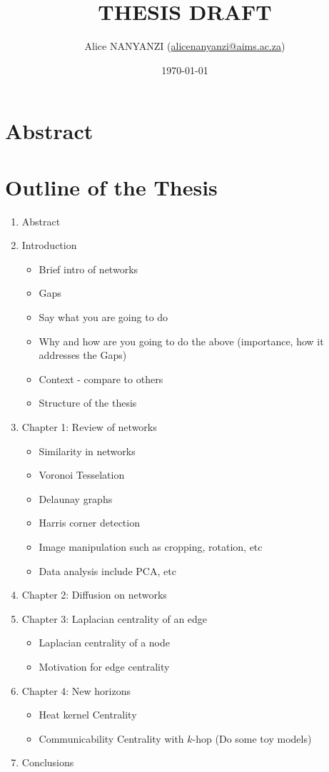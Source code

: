 \documentclass[10pt,a4paper]{article}
\author{Alice NANYANZI (\href{mailto:alicenanyanzi@aims.ac.za}{alicenanyanzi@aims.ac.za})}
\title{THESIS DRAFT}
\date{\today}
\theoremstyle{plain}
\theoremstyle{definition}
\begin{document}
	\maketitle
	\section*{Abstract}
	\newpage
	\listoffigures
	
	\listoftables
	\newpage

	
	\section*{Outline of the Thesis}
	\begin{enumerate}
		\item Abstract
		\item Introduction
		\begin{itemize}
			\item Brief intro of networks
			\item Gaps
			\item Say what you are going to do
			\item Why and how are you going to do the above (importance, how it addresses the Gaps) 
			\item Context - compare to others
			\item Structure of the thesis
		\end{itemize}
	    \item Chapter 1: Review of networks
	     \begin{itemize}
	     	\item Similarity in networks
	     	\item Voronoi Tesselation
	     	\item Delaunay graphs
	     	\item Harris corner detection
	     	\item Image manipulation such as cropping, rotation, etc
	     	\item Data analysis include PCA, etc
	     \end{itemize}
        \item Chapter 2: Diffusion on networks
        \item Chapter 3: Laplacian centrality of an edge
        \begin{itemize}
        	\item Laplacian centrality of a node
        	\item Motivation for edge centrality
        \end{itemize}
        \item Chapter 4: New horizons
        \begin{itemize}
        	\item Heat kernel Centrality
        	\item Communicability Centrality with $k$-hop (Do some toy models)
        \end{itemize}
        \item Conclusions
	\end{enumerate}
	
\end{document}
